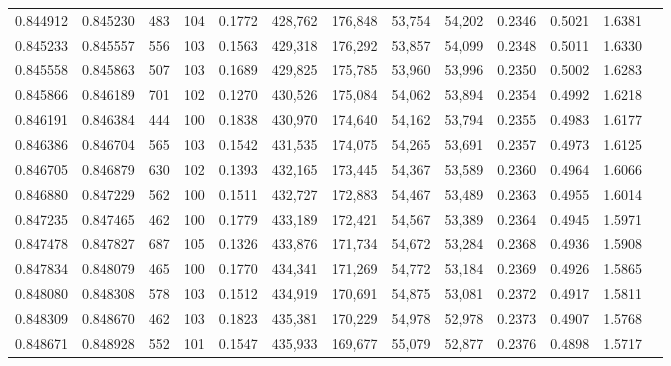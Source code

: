 \begin{tabular}{rrrrrrrrrrrrr}
0.844912 & 0.845230 &   483 & 104 &                                     0.1772 & 428,762 & 176,848 &  53,754 &  54,202 & 0.2346 & 0.5021 & 1.6381 \\
0.845233 & 0.845557 &   556 & 103 &                                     0.1563 & 429,318 & 176,292 &  53,857 &  54,099 & 0.2348 & 0.5011 & 1.6330 \\
0.845558 & 0.845863 &   507 & 103 &                                     0.1689 & 429,825 & 175,785 &  53,960 &  53,996 & 0.2350 & 0.5002 & 1.6283 \\
0.845866 & 0.846189 &   701 & 102 &                                     0.1270 & 430,526 & 175,084 &  54,062 &  53,894 & 0.2354 & 0.4992 & 1.6218 \\
0.846191 & 0.846384 &   444 & 100 &                                     0.1838 & 430,970 & 174,640 &  54,162 &  53,794 & 0.2355 & 0.4983 & 1.6177 \\
0.846386 & 0.846704 &   565 & 103 &                                     0.1542 & 431,535 & 174,075 &  54,265 &  53,691 & 0.2357 & 0.4973 & 1.6125 \\
0.846705 & 0.846879 &   630 & 102 &                                     0.1393 & 432,165 & 173,445 &  54,367 &  53,589 & 0.2360 & 0.4964 & 1.6066 \\
0.846880 & 0.847229 &   562 & 100 &                                     0.1511 & 432,727 & 172,883 &  54,467 &  53,489 & 0.2363 & 0.4955 & 1.6014 \\
0.847235 & 0.847465 &   462 & 100 &                                     0.1779 & 433,189 & 172,421 &  54,567 &  53,389 & 0.2364 & 0.4945 & 1.5971 \\
0.847478 & 0.847827 &   687 & 105 &                                     0.1326 & 433,876 & 171,734 &  54,672 &  53,284 & 0.2368 & 0.4936 & 1.5908 \\
0.847834 & 0.848079 &   465 & 100 &                                     0.1770 & 434,341 & 171,269 &  54,772 &  53,184 & 0.2369 & 0.4926 & 1.5865 \\
0.848080 & 0.848308 &   578 & 103 &                                     0.1512 & 434,919 & 170,691 &  54,875 &  53,081 & 0.2372 & 0.4917 & 1.5811 \\
0.848309 & 0.848670 &   462 & 103 &                                     0.1823 & 435,381 & 170,229 &  54,978 &  52,978 & 0.2373 & 0.4907 & 1.5768 \\
0.848671 & 0.848928 &   552 & 101 &                                     0.1547 & 435,933 & 169,677 &  55,079 &  52,877 & 0.2376 & 0.4898 & 1.5717 \\

\end{tabular}
